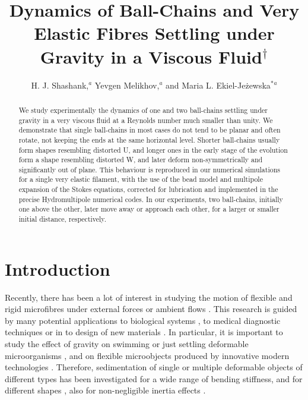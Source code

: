 \documentclass{article}
\title{Dynamics of Ball-Chains and Very Elastic Fibres Settling under Gravity in a Viscous Fluid$^\dag$}
\author{H. J. Shashank,\textit{$^{a}$} Yevgen Melikhov,\textit{$^{a}$} and Maria L. Ekiel-Je\.zewska$^{\ast}$\textit{$^{a}$} }
\begin{document}
\renewcommand{\thefootnote}{\fnsymbol{footnote}}
\renewcommand\footnoterule{\vspace*{1pt}
 \hrule width 3.5in height 0.4pt \vspace*{5pt}} 

\maketitle

\begin{abstract}
    We study experimentally the dynamics of one and two ball-chains settling under gravity in a very viscous fluid at a Reynolds number much smaller than unity. We demonstrate that single ball-chains in most cases do not tend to be planar and often rotate, not keeping the ends at the same horizontal level. Shorter ball-chains usually form shapes resembling distorted U, and longer ones in the early stage of the evolution form a shape resembling distorted W, and later deform non-symmetrically and significantly out of plane. This behaviour is reproduced in our numerical simulations for a single very elastic filament, with the use of the bead model and multipole expansion of the Stokes equations, corrected for lubrication and implemented in the precise Hydromultipole numerical codes. In our experiments, two ball-chains, initially one above the other, later move away or approach each other, for a larger or smaller initial distance, respectively.
\end{abstract}






\section{Introduction} \label{Intro}
Recently, there has been a lot of interest in studying the motion of flexible and rigid microfibres under external forces \cite{witten2020review} or ambient flows \cite{du2019dynamics,Linder2015}. This research is guided by many potential applications %
to biological systems \cite{nguyen2014hydrodynamics,kantsler2012}, to medical diagnostic techniques \cite{zhang2020flow} or %
in to design of new materials \cite{nunes2013,perazzo2017}. 
In particular, it is important to study the effect of gravity on swimming or just settling deformable microorganisms \cite{slomka2020encounter,rizvi2020deformable}, and on flexible microobjects produced by innovative modern technologies \cite{xue2022shear}.
Therefore, sedimentation of single or multiple deformable objects of different types has been investigated for a wide range of bending stiffness, and for different shapes \cite{saggiorato2015conformations,bukowicki2018different,yu2021coil,silmore2021buckling}, also for non-negligible inertia effects \cite{ravichandran2022orientation}.
\end{document}
